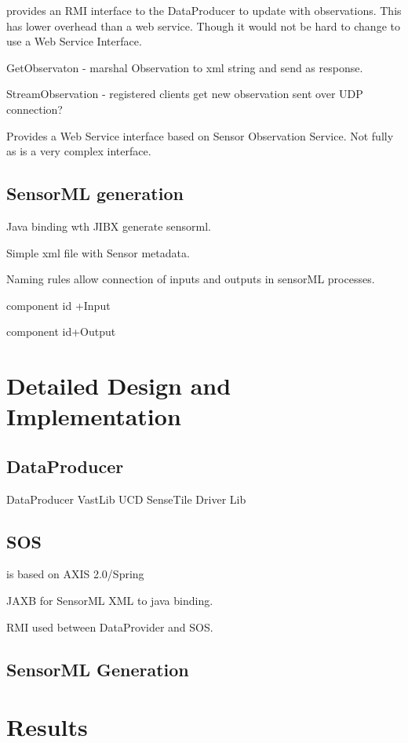 \documentclass[]{final_report}
\begin{document}
provides an RMI interface to the DataProducer to update with observations. This has lower overhead
than a web service. Though it would not be hard to change to use a Web Service Interface.

GetObservaton - marshal Observation to xml string and send as response.

StreamObservation -  registered clients get new observation sent over UDP connection?

Provides a Web Service interface  based on Sensor Observation Service. Not fully as is a very complex interface.

\newpage
\section{SensorML generation}

Java binding wth JIBX  generate sensorml.

Simple xml file with Sensor metadata.

Naming rules allow connection of inputs and outputs
in sensorML processes.

 component id +Input

 component id+Output

\chapter{ Detailed Design and Implementation}

\section{DataProducer}

DataProducer VastLib UCD SenseTile Driver Lib

\section{SOS}
 is based on AXIS 2.0/Spring

JAXB for SensorML XML to java binding.

RMI used between DataProvider and SOS.

\section{SensorML Generation}

\chapter{Results}
\end{document}
